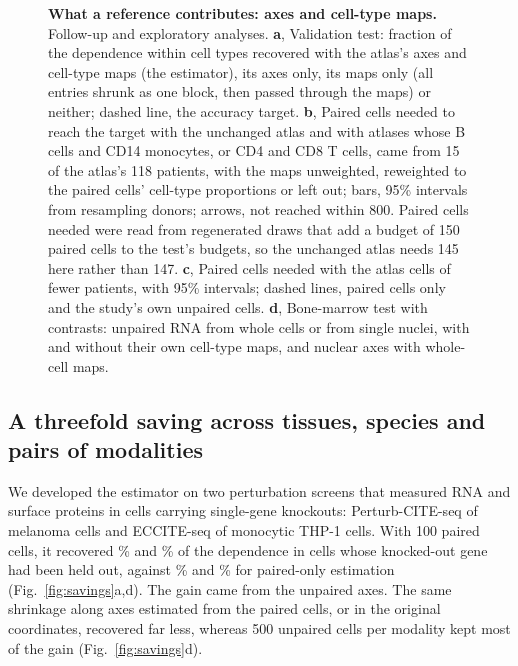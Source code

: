 \documentclass[pdflatex,sn-vancouver-num,iicol]{sn-jnl}
\begin{document}
\begin{figure}[tp]
\centering

\caption{\textbf{What a reference contributes: axes and cell-type maps.} Follow-up and exploratory analyses.
\textbf{a}, Validation test: fraction of the dependence within cell types recovered with the atlas's axes and cell-type maps (the estimator), its axes only, its maps only (all entries shrunk as one block, then passed through the maps) or neither; dashed line, the accuracy target.
\textbf{b}, Paired cells needed to reach the target with the unchanged atlas and with atlases whose B cells and CD14 monocytes, or CD4 and CD8 T cells, came from 15 of the atlas's 118 patients, with the maps unweighted, reweighted to the paired cells' cell-type proportions or left out; bars, 95\% intervals from resampling donors; arrows, not reached within 800. Paired cells needed were read from regenerated draws that add a budget of 150 paired cells to the test's budgets, so the unchanged atlas needs 145 here rather than 147.
\textbf{c}, Paired cells needed with the atlas cells of fewer patients, with 95\% intervals; dashed lines, paired cells only and the study's own unpaired cells.
\textbf{d}, Bone-marrow test with contrasts: unpaired RNA from whole cells or from single nuclei, with and without their own cell-type maps, and nuclear axes with whole-cell maps.}
\label{fig:reference}
\end{figure}

\subsection{A threefold saving across tissues, species and pairs of modalities}
We developed the estimator on two perturbation screens that measured RNA and surface proteins in cells carrying single-gene knockouts: Perturb-CITE-seq of melanoma cells\cite{frangieh2021} and ECCITE-seq of monocytic THP-1 cells\cite{papalexi2021}. With 100 paired cells, it recovered \SpFrRfHundred\% and \SpPaRfHundred\% of the dependence in cells whose knocked-out gene had been held out, against \SpFrPairedOnlyHundred\% and \SpPaPairedOnlyHundred\% for paired-only estimation (Fig.~\ref{fig:savings}a,d). The gain came from the unpaired axes. The same shrinkage along axes estimated from the paired cells, or in the original coordinates, recovered far less, whereas 500 unpaired cells per modality kept most of the gain (Fig.~\ref{fig:savings}d).
\end{document}
